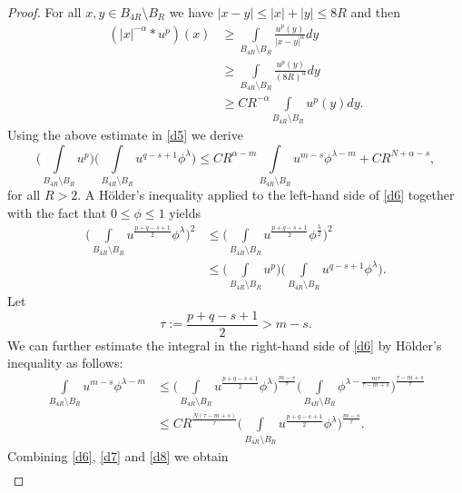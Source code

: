 \documentclass[leqno,12pt]{article}
\numberwithin{equation}{section}
\begin{document}
\begin{proof}
For all $x,y\in B_{4R}\setminus B_R$ we have $|x-y|\leq |x|+|y|\leq 8R$ and then
$$
\begin{aligned}
(|x|^{-\alpha}*u^p)(x)&\geq \int\limits_{B_{4R}\setminus B_{R}}\frac{u^{p}(y)}{|x-y|^{\alpha}}dy\\
&\geq \int\limits_{B_{4R}\setminus B_{R}}\frac{u^{p}(y)}{(8R)^{\alpha}}dy\\
&\geq CR^{-\alpha}\int\limits_{B_{4R}\setminus B_R}u^{p}(y)dy.
\end{aligned}
$$
Using the above estimate in \eqref{d5} we derive
\begin{equation}\label{d6}
\Big(\int\limits_{B_{4R}\setminus B_R}u^{p}\Big) \Big(\int\limits_{B_{4R}\setminus B_R} u^{q-s+1}\phi^\lambda \Big) \leq CR^{\alpha-m}\int\limits_{B_{4R}\setminus B_R} u^{m-s}\phi^{\lambda-m} +CR^{N+\alpha-s},
\end{equation}
for all $R>2$. A H\"older's inequality applied to the left-hand side of \eqref{d6} together with the fact that $0\leq \phi\leq 1$ yields
\begin{equation}\label{d7}
\begin{aligned}
\Big(\int\limits_{B_{4R}\setminus B_R} u^{\frac{p+q-s+1}{2}}\phi^\lambda \Big)^2&\leq \Big(\int\limits_{B_{4R}\setminus B_R} u^{\frac{p+q-s+1}{2}}\phi^{\frac{\lambda}{2}} \Big)^2\\
&\leq \Big( \int\limits_{B_{4R}\setminus B_R}u^{p}\Big) \Big(\int\limits_{B_{4R}\setminus B_R} u^{q-s+1}\phi^\lambda \Big).
\end{aligned}
\end{equation}
Let 
$$\tau:=\frac{p+q-s+1}{2}>m-s.
$$ 
We can further estimate the integral in the right-hand side of \eqref{d6} by H\"older's inequality as follows:
\begin{equation}\label{d8}
\begin{aligned}
\int\limits_{B_{4R}\setminus B_R} u^{m-s}\phi^{\lambda-m}
&\leq \Big(\int\limits_{B_{4R}\setminus B_R} u^{\frac{p+q-s+1}{2}}\phi^{\lambda}\Big)^{\frac{m-s}{\tau}}\Big(\int\limits_{B_{4R}\setminus B_R} \phi^{\lambda-\frac{m\tau}{\tau-m+s}}\Big)^{\frac{\tau-m+s}{\tau}}\\
&\leq CR^{\frac{N(\tau-m+s)}{\tau}} \Big(\int\limits_{B_{4R}\setminus B_R} u^{\frac{p+q-s+1}{2}}\phi^{\lambda}\Big)^{\frac{m-s}{\tau}}.
\end{aligned}
\end{equation}
Combining \eqref{d6}, \eqref{d7} and \eqref{d8} we obtain
\begin{equation}\label{d9}
\begin{aligned}

\end{aligned}
\end{equation}
\end{proof}
\end{document}
